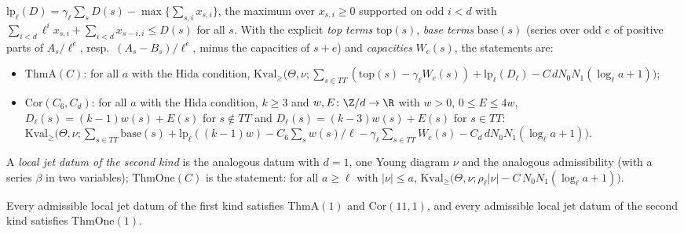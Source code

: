 \begin{definition}
\begin{enumerate}[label=(\alph*)]
$\mathrm{lp}_\ell(D)=\gamma_\ell\sum_sD(s)-\max\{\sum_{s,i}x_{s,i}\}$, the maximum over $x_{s,i}\ge0$ supported on odd $i<d$
with $\sum_{i<d}\ell^ix_{s,i}+\sum_{i<d}x_{s-i,i}\le D(s)$ for all $s$. With the explicit \emph{top terms} $\mathrm{top}(s)$,
\emph{base terms} $\mathrm{base}(s)$ (series over odd $e$ of positive parts of $A_s/\ell^e$, resp.\ $(A_s-B_s)/\ell^e$, minus
the capacities of $s+e$) and \emph{capacities} $W_c(s)$, the statements are:
\begin{itemize}
\item $\mathrm{ThmA}(C)$: for all $a$ with the Hida condition,
$\mathrm{Kval}_\ge\bigl(\Theta,\nu;\sum_{s\in TT}(\mathrm{top}(s)-\gamma_\ell W_c(s))+\mathrm{lp}_\ell(D_\ell)
-C\,dN_0N_1(\log_\ell a+1)\bigr)$;
\item $\mathrm{Cor}(C_6,C_d)$: for all $a$ with the Hida condition, $k\ge3$ and $w,E\colon\Z/d\to\R$ with $w>0$,
$0\le E\le4w$, $D_\ell(s)=(k-1)w(s)+E(s)$ for $s\notin TT$ and $D_\ell(s)=(k-3)w(s)+E(s)$ for $s\in TT$:
$\mathrm{Kval}_\ge\bigl(\Theta,\nu;\sum_{s\in TT}\mathrm{base}(s)+\mathrm{lp}_\ell((k-1)w)-C_6\sum_sw(s)/\ell
-\gamma_\ell\sum_{s\in TT}W_c(s)-C_d\,dN_0N_1(\log_\ell a+1)\bigr)$.
\end{itemize}
\end{enumerate}
A \emph{local jet datum of the second kind} is the analogous datum with $d=1$, one Young diagram $\nu$ and the analogous
admissibility (with a series $\beta$ in two variables); $\mathrm{ThmOne}(C)$ is the statement: for all $a\ge\ell$ with
$|\nu|\le a$, $\mathrm{Kval}_\ge\bigl(\Theta,\nu;\rho_\ell|\nu|-C\,N_0N_1(\log_\ell a+1)\bigr)$.
\end{definition}

\begin{theorem}\label{pf:sh-curv:split}
Every admissible local jet datum of the first kind satisfies $\mathrm{ThmA}(1)$ and $\mathrm{Cor}(11,1)$, and every
admissible local jet datum of the second kind satisfies $\mathrm{ThmOne}(1)$.
\end{theorem}

